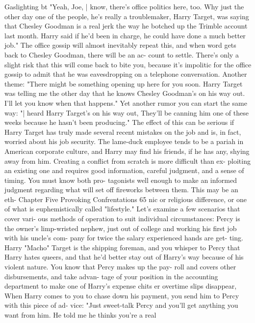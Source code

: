 \documentclass{book}
\begin{document}
Gaslighting 
bt 
"Yeah, Joe, | know, there's office politics here, too. 
Why just the other day one of the people, he's really a 
troublemaker, Harry Target, was saying that Chesley 
Goodman is a real jerk the way he botched up the 
Trimble account last month. Harry said if he'd been in 
charge, he could have done a much better job." 
The office gossip will almost inevitably repeat this, and 
when word gets back to Chesley Goodman, there will be an ac- 
count to settle. There's only a slight risk that this will come 
back to bite you, because it's impolitic for the office gossip to 
admit that he was eavesdropping on a telephone conversation. 
Another theme: 
"There might be something opening up here for you 
soon. Harry Target was telling me the other day that he 
knows Chesley Goodman's on his way out. I'll let you 
know when that happens." 
Yet another rumor you can start the same way: 
"| heard Harry Target's on his way out, They'll be 
canning him one of these weeks because he hasn't been 
producing." 
The effect of this can be serious if Harry Target has truly 
made several recent mistakes on the job and is, in fact, worried 
about his job security. The lame-duck employee tends to be a 
pariah in American corporate culture, and Harry may find his 
friends, if he has any, shying away from him. 
Creating a conflict from scratch is more difficult than ex- 
ploiting an existing one and requires good information, careful 
judgment, and a sense of timing. You must know both pro- 
tagonists well enough to make an informed judgment regarding 
what will set off fireworks between them. This may be an eth- 
Chapter Five 
Provoking Confrentations 
65 
nic or religious difference, or one of what is euphemistically 
called "lifestyle." Let's examine a few scenarios that cover vari- 
ous methods of operation to suit individual circumstances: 
Percy is the owner's limp-wristed nephew, just out of 
college and working his first job with his uncle's com- 
pany for twice the salary experienced hands are get- 
ting. Harry "Macho" Target is the shipping foreman, 
and you whisper to Percy that Harry hates queers, and 
that he'd better stay out of Harry's way because of his 
violent nature. You know that Percy makes up the pay- 
roll and covers other disbursements, and take advan- 
tage of your position in the accounting department to 
make one of Harry's expense chits er overtime slips 
disappear, When Harry comes to you to chase down his 
payment, you send him to Percy with this piece of ad- 
vice: 
"Just sweet-talk Percy and you'll get anything you 
want from him. He told me he thinks you're a real 
\end{document}
